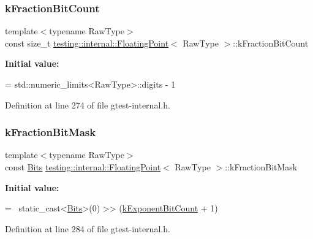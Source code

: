 \subsubsection{\texorpdfstring{k\+Fraction\+Bit\+Count}{kFractionBitCount}}
{\footnotesize\ttfamily template$<$typename Raw\+Type$>$ \\
const size\+\_\+t \hyperlink{classtesting_1_1internal_1_1FloatingPoint}{testing\+::internal\+::\+Floating\+Point}$<$ Raw\+Type $>$\+::k\+Fraction\+Bit\+Count\hspace{0.3cm}{\ttfamily [static]}}

{\bfseries Initial value\+:}
\begin{DoxyCode}
=
    std::numeric\_limits<RawType>::digits - 1
\end{DoxyCode}


Definition at line 274 of file gtest-\/internal.\+h.

\mbox{\label{classtesting_1_1internal_1_1FloatingPoint_a0ac75d4ffd24f14bca452abe8a718da1}} 
\subsubsection{\texorpdfstring{k\+Fraction\+Bit\+Mask}{kFractionBitMask}}
{\footnotesize\ttfamily template$<$typename Raw\+Type$>$ \\
const \hyperlink{classtesting_1_1internal_1_1FloatingPoint_abf228bf6cd48f12c8b44c85b4971a731}{Bits} \hyperlink{classtesting_1_1internal_1_1FloatingPoint}{testing\+::internal\+::\+Floating\+Point}$<$ Raw\+Type $>$\+::k\+Fraction\+Bit\+Mask\hspace{0.3cm}{\ttfamily [static]}}

{\bfseries Initial value\+:}
\begin{DoxyCode}
=
    ~static\_cast<\hyperlink{classtesting_1_1internal_1_1FloatingPoint_abf228bf6cd48f12c8b44c85b4971a731}{Bits}>(0) >> (\hyperlink{classtesting_1_1internal_1_1FloatingPoint_a1973d843c00781053d3073daa8a40119}{kExponentBitCount} + 1)
\end{DoxyCode}


Definition at line 284 of file gtest-\/internal.\+h.

\mbox{\label{classtesting_1_1internal_1_1FloatingPoint_aac498b3714d93f8e88cdc30e4c5935f6}} 
